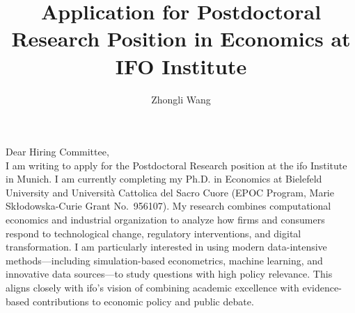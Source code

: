 \documentclass{nfr}
\title{Application for Postdoctoral Research Position in Economics at IFO Institute}
\author{Zhongli Wang}
\begin{document}

% 
% 
% 
% 


\maketitle


\noindent Dear Hiring Committee,\\[0.2cm]

I am writing to apply for the Postdoctoral Research position at the ifo Institute in Munich. 
I am currently completing my Ph.D. in Economics at Bielefeld University and Università Cattolica del Sacro Cuore (EPOC Program, Marie Skłodowska-Curie Grant No.~956107). 
My research combines computational economics and industrial organization to analyze how firms and consumers respond to technological change, regulatory interventions, and digital transformation. 
I am particularly interested in using modern data-intensive methods—including simulation-based econometrics, machine learning, and innovative data sources—to study questions with high policy relevance. 
This aligns closely with ifo’s vision of combining academic excellence with evidence-based contributions to economic policy and public debate.\\
\end{document}
